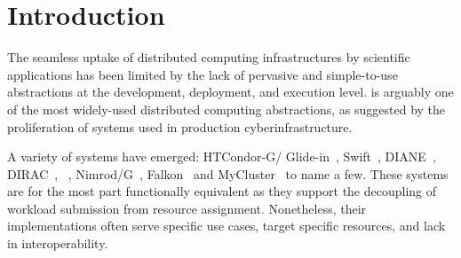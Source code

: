 \documentclass{sig-alternate}
\begin{document}
\begin{abstract}
\end{abstract}

\section{Introduction}
\label{sec:intro}


The seamless uptake of distributed computing infrastructures by scientific
applications has been limited by the lack of pervasive and simple-to-use
abstractions at the development, deployment, and execution level. \pilotjob is
arguably one of the most widely-used distributed computing abstractions, as
suggested by the proliferation of \pilotjob systems used in production
cyberinfrastructure.

A variety of \pilotjob systems have emerged: HTCondor-G/
Glide-in~\cite{frey2002condorG}, Swift~\cite{wilde2011swift},
DIANE~\cite{moscicki2003diane}, DIRAC~\cite{casajus2010dirac},
\panda~\cite{chiu2010pilot}, Nimrod/G~\cite{buyya2000nimrod},
Falkon~\cite{raicu2007} and
MyCluster~\cite{walker2006creating,walker2007personal} to name a few. These
systems are for the most part functionally equivalent as they support the
decoupling of workload submission from resource assignment. Nonetheless, their
implementations often serve specific use cases, target specific resources, and
lack in interoperability.
\end{document}
